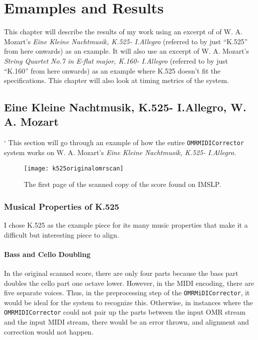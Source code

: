 \chapter{Emamples and Results}
This chapter will describe the results of my work using an excerpt of of W. A. Mozart's \textit{Eine Kleine Nachtmusik, K.525- I.Allegro} (referred to by just ``K.525'' from here onwards) as an example. It will also use an excerpt of W. A. Mozart's \textit{String Quartet No.7 in E-flat major, K.160- I.Allegro} (referred to by just ``K.160'' from here onwards) as an example where K.525 doesn't fit the specifications. This chapter will also look at timing metrics of the system.

\section{Eine Kleine Nachtmusik, K.525- I.Allegro, W. A. Mozart}		`
This section will go through an example of how the entire \texttt{OMRMIDICorrector} system works on W. A. Mozart's \textit{Eine Kleine Nachtmusik, K.525- I.Allegro}.

\begin{figure}[H]
\centering
\texttt{[image: k525originalomrscan]}
\caption{The first page of the scanned copy of the score found on IMSLP.}
\end{figure}

\subsection{Musical Properties of K.525}
I chose K.525 as the example piece for its many music properties that make it a difficult but interesting piece to align.

\subsubsection{Bass and Cello Doubling}
In the original scanned score, there are only four parts because the bass part doubles the cello part one octave lower. However, in the MIDI encoding, there are five separate voices. Thus, in the preprocessing step of the \texttt{OMRMiDICorrector}, it would be ideal for the system to recognize this. Otherwise, in instances where the \texttt{OMRMIDICorrector} could not pair up the parts between the input OMR stream and the input MIDI stream, there would be an error thrown, and alignment and correction would not happen. 

